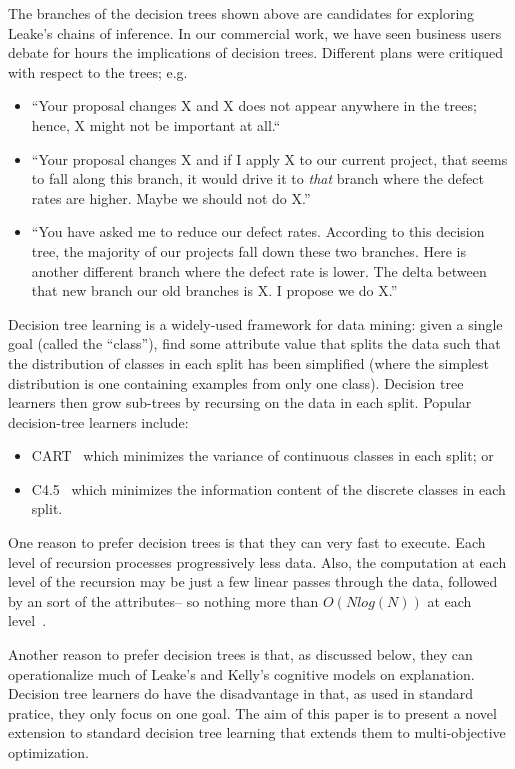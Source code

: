 \documentclass[runningheads]{llncs}
\newcommand{\bi}{\begin{itemize}}
\newcommand{\ei}{\end{itemize}}
\begin{document}
The branches of the decision trees shown above are candidates for
exploring Leake's chains of inference.  In our commercial
work, we have seen business users debate for hours the implications
of decision trees. Different plans were critiqued with respect to the trees;
e.g.
\bi
\item ``Your proposal changes X and X does not appear anywhere in the trees; hence, X might not be important at all.``
\item ``Your proposal changes X and if I apply X to our current project,
that seems to fall along this branch, it would drive it to {\em that}
branch where the defect rates are higher. Maybe we should not do X.''
\item
``You have asked me to reduce our defect rates. According to this decision
tree, the majority of our projects fall down these two branches. Here is
another different branch where the defect rate is lower. The delta between
that new branch our old branches is X. I propose we do X.''
\ei



Decision tree learning is a widely-used framework for data mining: given a single goal
(called the ``class''), find some attribute value that splits the data such
that the distribution of classes in each split has been simplified
(where the simplest distribution is one containing examples from only one class).
Decision tree learners then grow sub-trees by recursing on the data in  each split. 
Popular decision-tree learners include:
\bi
\item CART~\cite{breiman84,} which  minimizes the variance of continuous classes in each split; or
\item C4.5~\cite{quinlan92} which minimizes the information content of the discrete classes in each split.
\ei
One reason to prefer decision trees is that they can very fast to
execute. Each level of recursion
processes progressively less data. Also, the computation at each level of the recursion
may be just a few linear passes through the data, followed by an
sort of the attributes-- so nothing more than $O(Nlog(N))$ at each level~\cite{witten11}.

Another reason to prefer decision trees is that, as discussed below, they
can operationalize much of Leake's and Kelly's
cognitive models on explanation.  Decision tree learners do have the disadvantage in that,
as used in standard pratice, they only focus on one goal. The aim of this
paper is to present a novel extension to standard decision tree learning that
extends them  to multi-objective optimization.
\end{document}
